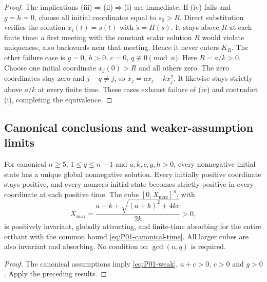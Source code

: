 \begin{proof}
The implications (iii)$\Rightarrow$(ii)$\Rightarrow$(i) are immediate.
If (iv) fails and $g=h=0$, choose all initial coordinates equal to
$s_0>R$. Direct substitution verifies the solution $x_i(t)=s(t)$
with $\dot s=H(s)$. It stays above $R$ at each finite time:
a first meeting with the constant scalar solution $R$ would violate
uniqueness, also backwards near that meeting. Hence it never enters
$K_R$. The other failure case is $g=0$, $h>0$, $c=0$,
$q\not\equiv0\pmod n$. Here $R=a/k>0$. Choose one initial coordinate
$x_j(0)>R$ and all others zero. The zero coordinates stay zero and
$j-q\ne j$, so $\dot x_j=a x_j-kx_j^2$. It likewise stays strictly
above $a/k$ at every finite time. These cases exhaust failure of (iv)
and contradict (i), completing the equivalence.
\end{proof}

\subsection{Canonical conclusions and weaker-assumption limits}
\label{slot:P01-4}

\begin{corollary}
\label{cor:P01-canonical}
For canonical $n\ge5$, $1\le q\le n-1$ and $a,k,c,g,h>0$, every
nonnegative initial state has a unique global nonnegative solution.
Every initially positive coordinate stays positive, and every nonzero
initial state becomes strictly positive in every coordinate at each
positive time. The cube $[0,X_{\max}]^n$, with
\[
 X_{\max}=\frac{a-k+\sqrt{(a+k)^2+4kc}}{2k}>0,
\]
is positively invariant, globally attracting, and finite-time absorbing
for the entire orthant with the common bound
\eqref{eq:P01-canonical-time}. All larger cubes are also invariant
and absorbing. No condition on $\gcd(n,q)$ is required.
\end{corollary}
\begin{proof}
The canonical assumptions imply \eqref{eq:P01-weak}, $a+c>0$,
$c>0$ and $g>0$. Apply the preceding results.
\end{proof}

